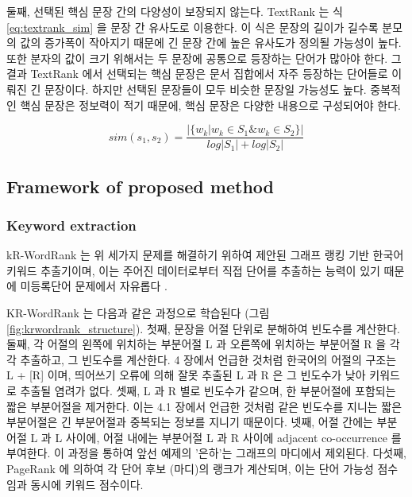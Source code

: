 \documentclass[11pt]{article}
\begin{document}
둘째, 선택된 핵심 문장 간의 다양성이 보장되지 않는다.
TextRank 는 식 \ref{eq:textrank_sim} 을 문장 간 유사도로 이용한다.
이 식은 문장의 길이가 길수록 분모의 값의 증가폭이 작아지기 때문에 긴 문장 간에 높은 유사도가 정의될 가능성이 높다.
또한 분자의 값이 크기 위해서는 두 문장에 공통으로 등장하는 단어가 많아야 한다.
그 결과 TextRank 에서 선택되는 핵심 문장은 문서 집합에서 자주 등장하는 단어들로 이뤄진 긴 문장이다.
하지만 선택된 문장들이 모두 비슷한 문장일 가능성도 높다.
중복적인 핵심 문장은 정보력이 적기 때문에, 핵심 문장은 다양한 내용으로 구성되어야 한다.

\begin{equation}
    \label{eq:textrank_sim}
    sim(s_1, s_2) = \frac{\vert \{ w_k \vert w_k \in S_1 \& w_k \in S_2 \} \vert}{log \vert S_1 \vert + log \vert S_2 \vert}
\end{equation}

\subsection{Framework of proposed method}

\subsubsection{Keyword extraction}

kR-WordRank 는 위 세가지 문제를 해결하기 위하여 제안된 그래프 랭킹 기반 한국어 키워드 추출기이며, 이는 주어진 데이터로부터 직접 단어를 추출하는 능력이 있기 때문에 미등록단어 문제에서 자유롭다 \citep{kim2014kr}.

KR-WordRank 는 다음과 같은 과정으로 학습된다 (그림 \ref{fig:krwordrank_structure}).
첫째, 문장을 어절 단위로 분해하여 빈도수를 계산한다.
둘째, 각 어절의 왼쪽에 위치하는 부분어절 L 과 오른쪽에 위치하는 부분어절 R 을 각각 추출하고, 그 빈도수를 계산한다. 4 장에서 언급한 것처럼 한국어의 어절의 구조는 L + [R] 이며, 띄어쓰기 오류에 의해 잘못 추출된 L 과 R 은 그 빈도수가 낮아 키워드로 추출될 염려가 없다.
셋째, L 과 R 별로 빈도수가 같으며, 한 부분어절에 포함되는 짧은 부분어절을 제거한다. 이는 4.1 장에서 언급한 것처럼 같은 빈도수를 지니는 짧은 부분어절은 긴 부분어절과 중복되는 정보를 지니기 때문이다.
넷째, 어절 간에는 부분어절 L 과 L 사이에, 어절 내에는 부분어절 L 과 R 사이에 adjacent co-occurrence 를 부여한다. 이 과정을 통하여 앞선 예제의 '은하'는 그래프의 마디에서 제외된다.
다섯째, PageRank 에 의하여 각 단어 후보 (마디)의 랭크가 계산되며, 이는 단어 가능성 점수임과 동시에 키워드 점수이다.
\end{document}
